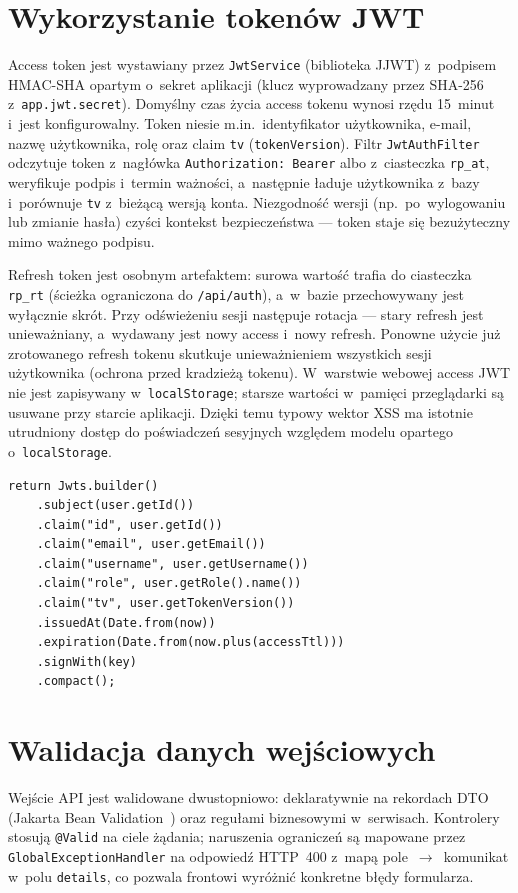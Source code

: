 \documentclass{sprz}
\begin{document}
\section{Wykorzystanie tokenów JWT}
Access token jest wystawiany przez \texttt{JwtService} (biblioteka JJWT) z~podpisem HMAC-SHA opartym o~sekret aplikacji (klucz wyprowadzany przez SHA-256 z~\texttt{app.jwt.secret}). Domyślny czas życia access tokenu wynosi rzędu 15~minut i~jest konfigurowalny. Token niesie m.in.\ identyfikator użytkownika, e-mail, nazwę użytkownika, rolę oraz claim \texttt{tv} (\texttt{tokenVersion}). Filtr \texttt{JwtAuthFilter} odczytuje token z~nagłówka \texttt{Authorization: Bearer} albo z~ciasteczka \texttt{rp\_at}, weryfikuje podpis i~termin ważności, a~następnie ładuje użytkownika z~bazy i~porównuje \texttt{tv} z~bieżącą wersją konta. Niezgodność wersji (np.\ po~wylogowaniu lub zmianie hasła) czyści kontekst bezpieczeństwa --- token staje się bezużyteczny mimo ważnego podpisu.

Refresh token jest osobnym artefaktem: surowa wartość trafia do ciasteczka \texttt{rp\_rt} (ścieżka ograniczona do \texttt{/api/auth}), a~w~bazie przechowywany jest wyłącznie skrót. Przy odświeżeniu sesji następuje rotacja --- stary refresh jest unieważniany, a~wydawany jest nowy access i~nowy refresh. Ponowne użycie już zrotowanego refresh tokenu skutkuje unieważnieniem wszystkich sesji użytkownika (ochrona przed kradzieżą tokenu). W~warstwie webowej access JWT nie jest zapisywany w~\texttt{localStorage}; starsze wartości w~pamięci przeglądarki są usuwane przy starcie aplikacji. Dzięki temu typowy wektor XSS ma istotnie utrudniony dostęp do poświadczeń sesyjnych względem modelu opartego o~\texttt{localStorage}.

\begin{lstlisting}[caption={Claimy access JWT wystawiane przez \texttt{JwtService}},label={lst:jwt-claims}]
return Jwts.builder()
    .subject(user.getId())
    .claim("id", user.getId())
    .claim("email", user.getEmail())
    .claim("username", user.getUsername())
    .claim("role", user.getRole().name())
    .claim("tv", user.getTokenVersion())
    .issuedAt(Date.from(now))
    .expiration(Date.from(now.plus(accessTtl)))
    .signWith(key)
    .compact();
\end{lstlisting}

\section{Walidacja danych wejściowych}
Wejście API jest walidowane dwustopniowo: deklaratywnie na rekordach DTO (Jakarta Bean Validation~\cite{jakarta:validation}) oraz regułami biznesowymi w~serwisach. Kontrolery stosują \texttt{@Valid} na ciele żądania; naruszenia ograniczeń są mapowane przez \texttt{GlobalExceptionHandler} na odpowiedź HTTP~400 z~mapą pole~$\rightarrow$~komunikat w~polu \texttt{details}, co pozwala frontowi wyróżnić konkretne błędy formularza.
\end{document}
